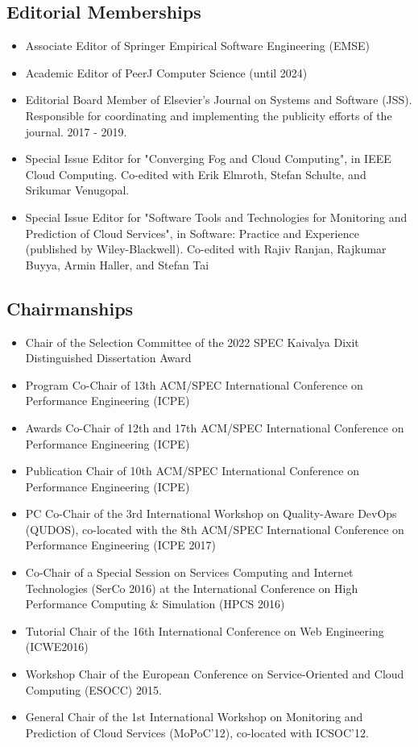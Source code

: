 \documentclass[paper=letter,fontsize=11pt]{scrartcl} %
\begin{document}
\subsection*{Editorial Memberships}
\begin{itemize}
\item Associate Editor of Springer Empirical Software Engineering (EMSE)
\item Academic Editor of PeerJ Computer Science (until 2024)
\item Editorial Board Member of Elsevier's Journal on Systems and Software (JSS). Responsible for coordinating and implementing the publicity efforts of the journal. 2017 - 2019.
\item Special Issue Editor for "Converging Fog and Cloud Computing", in IEEE Cloud Computing. Co-edited with Erik Elmroth, Stefan Schulte, and Srikumar Venugopal.
\item Special Issue Editor for "Software Tools and Technologies for Monitoring and Prediction of Cloud Services", in Software: Practice and Experience (published by Wiley-Blackwell). Co-edited with Rajiv Ranjan, Raj\-kumar Buyya, Armin Haller, and Stefan Tai
\end{itemize}

\subsection*{Chairmanships}
\begin{itemize}
\item Chair of the Selection Committee of the 2022 SPEC Kaivalya Dixit Distinguished Dissertation Award 
\item Program Co-Chair of 13th ACM/SPEC International Conference on Performance Engineering (ICPE) 
\item Awards Co-Chair of 12th and 17th ACM/SPEC International Conference on Performance Engineering (ICPE)
\item Publication Chair of 10th ACM/SPEC International Conference on Performance Engineering (ICPE)
\item PC Co-Chair of the  3rd International Workshop on Quality-Aware DevOps (QUDOS), co-located with the  8th ACM/SPEC International Conference on Performance Engineering (ICPE 2017)
\item Co-Chair of a Special Session on Services Computing and Internet Technologies (SerCo 2016) at the International Conference on High Performance Computing \& Simulation (HPCS 2016)
\item Tutorial Chair of the 16th International Conference on Web Engineering (ICWE2016)
\item Workshop Chair of the European Conference on Service-Oriented
and Cloud Computing (ESOCC) 2015.
\item General Chair of the 1st International Workshop on Monitoring and
Prediction of Cloud Services (MoPoC'12), co-located with ICSOC'12.
\end{itemize}
\end{document}
